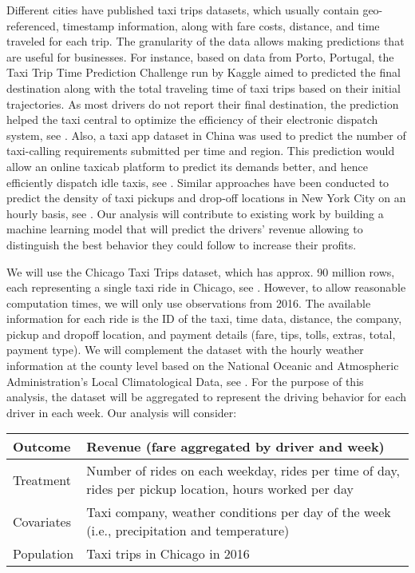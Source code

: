 \documentclass[twoside,11pt]{article}
\begin{document}
Different cities have published taxi trips datasets, which usually contain geo-referenced, timestamp information, along with fare costs, distance, and time traveled for each trip. The granularity of the data allows making predictions that are useful for businesses. For instance, based on data from Porto, Portugal, the Taxi Trip Time Prediction Challenge run by Kaggle aimed to predicted the final destination along with the total traveling time of taxi trips based on their initial trajectories. As most drivers do not report their final destination, the prediction helped the taxi central to optimize the efficiency of their electronic dispatch system, see \cite{TaxiTravelTime}. Also, a taxi app dataset in China was used to predict the number of taxi-calling requirements submitted per time and region. This prediction would allow an online taxicab platform to predict its demands better, and hence efficiently dispatch idle taxis, see \cite{TaxiDemand2}. Similar approaches have been conducted to predict the density of taxi pickups and drop-off locations in New York City on an hourly basis, see \cite{NYCTaxi}. Our analysis will contribute to existing work by building a machine learning model that will predict the drivers' revenue allowing to distinguish the best behavior they could follow to increase their profits.\par

We will use the Chicago Taxi Trips dataset, which has approx. 90 million rows, each representing a single taxi ride in Chicago, see \cite{ChicagoDataPortal}. However, to allow reasonable computation times, we will only use observations from 2016. The available information for each ride is the ID of the taxi, time data, distance, the company, pickup and dropoff location, and payment details (fare, tips, tolls, extras, total, payment type). We will complement the dataset with the hourly weather information at the county level based on the National Oceanic and Atmospheric Administration's Local Climatological Data, see \cite{NOAA}. For the purpose of this analysis, the dataset will be aggregated to represent the driving behavior for each driver in each week. Our analysis will consider:

\begin{table}[h]
\centering
\begin{tabularx}{14cm}{|l|X|}
\hline
Outcome & Revenue (fare aggregated by driver and week)\\
\hline
Treatment & Number of rides on each weekday, rides per time of day, rides per pickup location, hours worked per day\\
\hline
Covariates &  Taxi company, weather conditions per day of the week (i.e., precipitation and temperature)\\
\hline
Population & Taxi trips in Chicago in 2016\\
\hline
\end{tabularx}
\end{table}
\end{document}
